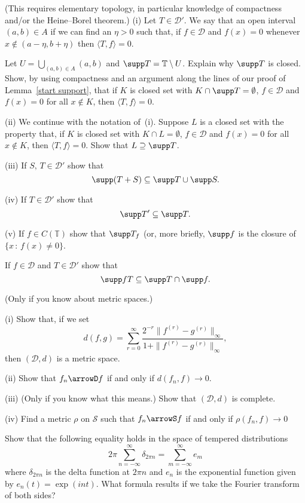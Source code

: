 \begin{question}\label{support} (This requires elementary topology,
in particular knowledge of compactness and/or the Heine--Borel
theorem.)
(i) Let $T\in{\mathcal D}'$. We say that an open interval
$(a,b)\in A$ if we can find an $\eta>0$ such that,
if $f\in{\mathcal D}$ and $f(x)=0$ whenever
$x\notin(a-\eta,b+\eta)$ then $\langle T,f\rangle=0$.

Let $U=\bigcup_{(a,b)\in A}(a,b)$ and $\supp T={\mathbb T}\setminus U$.
Explain why $\supp T$ is closed.
Show, by using compactness and an argument along the lines
of our proof of Lemma~\ref{start support}, that
if $K$ is closed set with $K\cap\supp T=\emptyset$,
$f\in{\mathcal D}$ and $f(x)=0$ for all $x\notin K$,
then $\langle T,f\rangle=0$.

(ii) We continue with the notation of~(i).
Suppose $L$ is a closed set with the property
that, if $K$ is closed set with $K\cap L=\emptyset$,
$f\in{\mathcal D}$ and $f(x)=0$ for all $x\notin K$,
then $\langle T,f\rangle=0$. Show that $L\supseteq \supp T$.

(iii) If $S,\,T\in{\mathcal D}'$ show that
\[\supp(T+S)\subseteq \supp T \cup \supp S.\]

(iv) If $T\in{\mathcal D}'$ show that
\[\supp T'\subseteq \supp T.\]

(v) If $f\in C({\mathbb T})$ show that
$\supp T_{f}$ (or, more briefly, $\supp f$
is the closure of $\{x\,:\,f(x)\neq 0\}$.

If $f\in{\mathcal D}$ and $T\in{\mathcal D}'$ show that
\[\supp fT\subseteq \supp T\cap  \supp f.\]
\end{question}
\begin{question} (Only if you know about metric spaces.)

(i) Show that, if we set
\[d(f,g)=\sum_{r=0}^{\infty}
\frac{2^{-r}\|f^{(r)}-g^{(r)}\|_{\infty}}{1+\|f^{(r)}-g^{(r)}\|_{\infty}},\]
then $({\mathcal D},d)$ is a metric space.

(ii) Show that $f_{n}\arrowD f$ if and only if $d(f_{n},f)\rightarrow 0$.

(iii) (Only if you know what this means.)
Show that $({\mathcal D},d)$ is complete.

(iv) Find a metric $\rho$ on ${\mathcal S}$ such that
$f_{n}\arrowS f$ if and only if $\rho(f_{n},f)\rightarrow 0$

\end{question}
\begin{question} Show that the following equality holds
in the space of tempered distributions
\[2\pi\sum_{n=-\infty}^{\infty}\delta_{2\pi n}
=\sum_{m=-\infty}^{\infty}e_{m}\]
where $\delta_{2\pi n}$ is the delta function at $2\pi n$ and $e_{n}$
is the exponential function given by $e_{n}(t)=\exp(int)$.
What formula results if we take the Fourier transform
of both sides?
\end{question}

